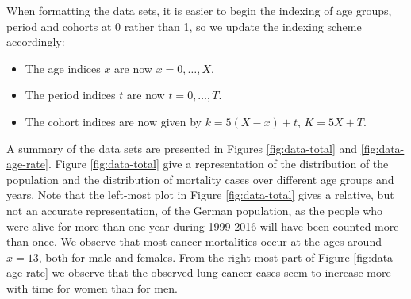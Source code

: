 When formatting the data sets, it is easier to begin the indexing of age groups, period and cohorts at 0 rather than 1, so we update the indexing scheme accordingly:
\begin{itemize}
    \item The age indices $x$ are now $x = 0,\ldots,X$.
    \item The period indices $t$ are now $t = 0, \ldots, T$.
    \item The cohort indices are now given by $k = 5(X - x) + t$, $K = 5X + T$.
\end{itemize}

A summary of the data sets are presented in Figures \ref{fig:data-total} and \ref{fig:data-age-rate}. Figure \ref{fig:data-total} give a representation of the distribution of the population and the distribution of mortality cases over different age groups and years. Note that the left-most plot in Figure \ref{fig:data-total} gives a relative, but not an accurate representation, of the German population, as the people who were alive for more than one year during 1999-2016 will have been counted more than once. We observe that most cancer mortalities occur at the ages around $x = 13$, both for male and females. From the right-most part of Figure \ref{fig:data-age-rate} we observe that the observed lung cancer cases seem to increase more with time for women than for men. 

